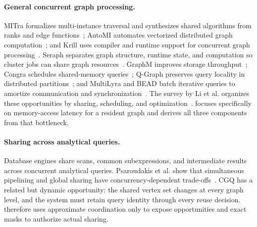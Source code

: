 \paragraph{General concurrent graph processing.}
MITra formalizes multi-instance traversal and synthesizes shared algorithms from ranks and edge functions~\cite{li_mitra_2023}; AutoMI automates vectorized distributed graph computation~\cite{zhao_automating_2024}; and Krill uses compiler and runtime support for concurrent graph processing~\cite{chen_krill_2021}.  Seraph separates graph structure, runtime state, and computation so cluster jobs can share graph resources~\cite{xue_seraph_2014,xue_processing_2017}.  GraphM improves storage throughput~\cite{zhao_graphm_2019}; Congra schedules shared-memory queries~\cite{pan_congra_2017}; Q-Graph preserves query locality in distributed partitions~\cite{mayer_qgraph_2018}; and MultiLyra and BEAD batch iterative queries to amortize communication and synchronization~\cite{mazloumi_multilyra_2019,mazloumi_bead_2020}.  The survey by Li et al. organizes these opportunities by sharing, scheduling, and optimization~\cite{li_survey_2024}.  \system focuses specifically on memory-access latency for a resident graph and derives all three components from that bottleneck.

\paragraph{Sharing across analytical queries.}
Database engines share scans, common subexpressions, and intermediate results across concurrent analytical queries.  Psaroudakis et al. show that simultaneous pipelining and global sharing have concurrency-dependent trade-offs~\cite{psaroudakis_sharing_2013}.  CGQ has a related but dynamic opportunity: the shared vertex set changes at every graph level, and the system must retain query identity through every reuse decision.  \system therefore uses approximate coordination only to expose opportunities and exact masks to authorize actual sharing.
